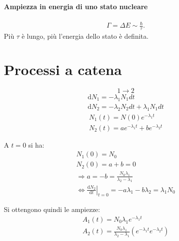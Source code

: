 \documentclass[a4paper,11pt,twoside,openany]{book}
\theoremstyle{definition}
\theoremstyle{plain}
\theoremstyle{plain}
\theoremstyle{definition}
\begin{document}
\paragraph{Ampiezza in energia di uno stato nucleare}
\begin{equation}\begin{split}
\Gamma=\Delta E \sim \frac{\hbar }{\tau}.
\end{split}\end{equation}
Più $\tau$ è lungo, più l'energia dello stato è definita.

\section{Processi a catena} %
$$1\longrightarrow 2$$
\begin{equation}\begin{split}
\textrm{d}N_1=-\lambda_1N_1 dt\\
\textrm{d}N_2=-\lambda_2N_2 dt+\lambda_1N_1 dt
\end{split}\end{equation}
\begin{equation}\begin{split}
N_1\left(t\right)=N\left(0\right)e^{-\lambda_1 t}\\
N_2\left(t\right)=ae^{-\lambda_1t}+be^{-\lambda_2t}
\end{split}\end{equation}

A $t=0$ si ha:
\begin{equation}\begin{split}
N_1\left(0\right)=N_0\\
N_2\left(0\right)=a+b=0\\
\Longrightarrow a=-b=\frac{N_0\lambda_1}{\lambda_2-\lambda_1}\\
\Longleftrightarrow \left.\frac{\textrm{d}N_2}{\textrm{d}t}\right|_{t=0}=-a\lambda_1-b\lambda_2=\lambda_1N_0
\end{split}\end{equation}

Si ottengono quindi le ampiezze:
\begin{equation}\begin{split}
A_1\left(t\right)=N_0\lambda_1e^{-\lambda_1t}\\
A_2\left(t\right)=\frac{N_0\lambda_1}{\lambda_2-\lambda_1}\left(e^{-\lambda_1t}e^{-\lambda_2t}\right)
\end{split}\end{equation}
\end{document}
